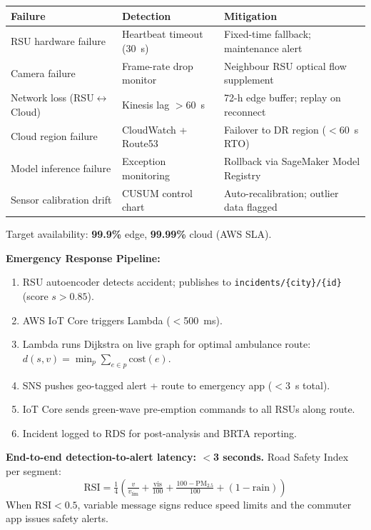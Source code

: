 \documentclass[11pt,a4paper]{article}
\begin{document}
\renewcommand{\arraystretch}{1.2}
\begin{center}
\begin{tabular}{|L{3.2cm}|L{3.4cm}|L{4.8cm}|}
\hline
\textbf{Failure} & \textbf{Detection} & \textbf{Mitigation} \\
\hline
RSU hardware failure & Heartbeat timeout (30~s) & Fixed-time fallback; maintenance alert \\
\hline
Camera failure & Frame-rate drop monitor & Neighbour RSU optical flow supplement \\
\hline
Network loss (RSU$\leftrightarrow$Cloud) & Kinesis lag $>$60~s & 72-h edge buffer; replay on reconnect \\
\hline
Cloud region failure & CloudWatch + Route53 & Failover to DR region ($<$60~s RTO) \\
\hline
Model inference failure & Exception monitoring & Rollback via SageMaker Model Registry \\
\hline
Sensor calibration drift & CUSUM control chart & Auto-recalibration; outlier data flagged \\
\hline
\end{tabular}
\end{center}

Target availability: \textbf{99.9\%} edge, \textbf{99.99\%} cloud (AWS SLA).

\vspace{3pt}
\noindent\textbf{Emergency Response Pipeline:}
\begin{enumerate}[leftmargin=1.4cm]
  \item RSU autoencoder detects accident; publishes to \texttt{incidents/\{city\}/\{id\}} (score $s>0.85$).
  \item AWS IoT Core triggers Lambda ($<$500~ms).
  \item Lambda runs Dijkstra on live graph for optimal ambulance route: $d(s,v)=\min_{p}\sum_{e\in p}\text{cost}(e)$.
  \item SNS pushes geo-tagged alert + route to emergency app ($<$3~s total).
  \item IoT Core sends green-wave pre-emption commands to all RSUs along route.
  \item Incident logged to RDS for post-analysis and BRTA reporting.
\end{enumerate}
\noindent\textbf{End-to-end detection-to-alert latency: $<$3 seconds.} Road Safety Index per segment:
\[
  \text{RSI} = \tfrac{1}{4}\!\left(\tfrac{v}{v_{\lim}} + \tfrac{\text{vis}}{100} + \tfrac{100-\text{PM}_{2.5}}{100} + (1-\text{rain})\right)
\]
When $\text{RSI}<0.5$, variable message signs reduce speed limits and the commuter app issues safety alerts.
\end{document}
